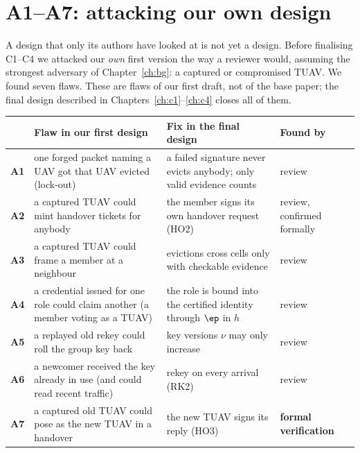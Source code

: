 \chapter{A1--A7: attacking our own design}\label{ch:hard}
A design that only its authors have looked at is not yet a design. Before finalising C1--C4 we attacked our \emph{own} first version the way a
reviewer would, assuming the strongest adversary of Chapter~\ref{ch:bg}: a captured or compromised TUAV. We found seven flaws. These are flaws of our first
draft, not of the base paper; the final design described in Chapters~\ref{ch:c1}--\ref{ch:c4} closes all of them.

\begin{center}
\small
\begin{tabularx}{\linewidth}{@{}l X X l@{}}
\toprule
& \textbf{Flaw in our first design} & \textbf{Fix in the final design} & \textbf{Found by}\\
\midrule
\textbf{A1} & one forged packet naming a UAV got that UAV evicted (lock-out) & a failed signature never evicts anybody; only valid evidence counts & review\\
\textbf{A2} & a captured TUAV could mint handover tickets for anybody & the member signs its own handover request (HO2) & review, confirmed formally\\
\textbf{A3} & a captured TUAV could frame a member at a neighbour & evictions cross cells only with checkable evidence & review\\
\textbf{A4} & a credential issued for one role could claim another (a member voting as a TUAV) & the role is bound into the certified identity through $\ep$ in $h$ & review\\
\textbf{A5} & a replayed old rekey could roll the group key back & key versions $\nu$ may only increase & review\\
\textbf{A6} & a newcomer received the key already in use (and could read recent traffic) & rekey on every arrival (RK2) & review\\
\textbf{A7} & a captured old TUAV could pose as the new TUAV in a handover & the new TUAV signs its reply (HO3) & \textbf{formal verification}\\
\bottomrule
\end{tabularx}
\end{center}

